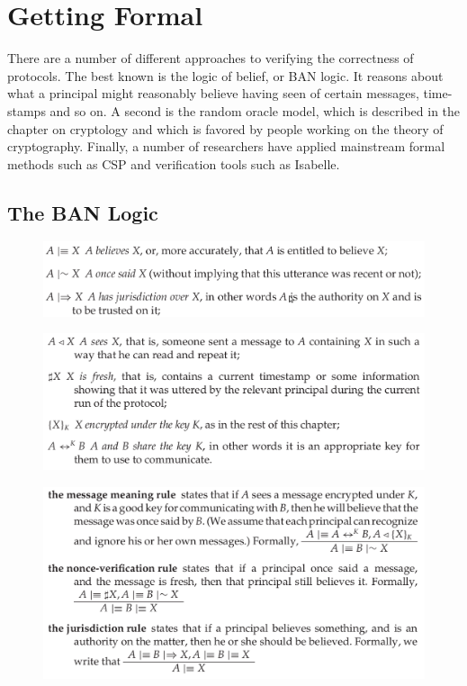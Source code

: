 \section{Getting Formal}

	There are a number of different approaches to verifying the correctness
	of protocols. The best known is the logic of belief, or BAN logic. 
	It reasons about what a principal might reasonably believe having seen 
	of certain messages, time-	stamps and so on. A second is the random oracle 
	model, which is described in the chapter on cryptology and which is favored 
	by people working on the theory of cryptography.
	Finally, a number of researchers have applied mainstream formal methods
	such as CSP and verification tools such as Isabelle.

	\subsection{The BAN Logic}

	\begin{figure}[H]
		\includegraphics[scale=0.3]{pics/BAN1.png}
	\end{figure}
	\begin{figure}[H]
		\includegraphics[scale=0.3]{pics/BAN2.png}
	\end{figure}
	\begin{figure}[H]
		\includegraphics[scale=0.3]{pics/BAN3.png}
	\end{figure}



